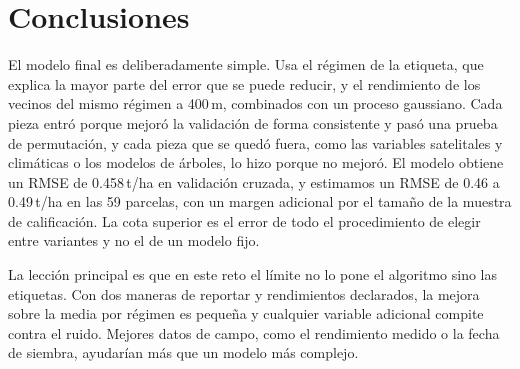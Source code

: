 \section{Conclusiones}\label{sec:conclusiones}

El modelo final es deliberadamente simple. Usa el régimen de la etiqueta, que explica la mayor parte del error que se
puede reducir, y el rendimiento de los vecinos del mismo régimen a 400\,m, combinados con un proceso gaussiano. Cada
pieza entró porque mejoró la validación de forma consistente y pasó una prueba de permutación, y cada pieza que se
quedó fuera, como las variables satelitales y climáticas o los modelos de árboles, lo hizo porque no mejoró. El
modelo obtiene un RMSE de 0.458\,t/ha en validación cruzada, y estimamos un RMSE de 0.46 a 0.49\,t/ha en las 59
parcelas, con un margen adicional por el tamaño de la muestra de calificación. La cota superior es el error de todo el
procedimiento de elegir entre variantes y no el de un modelo fijo.

La lección principal es que en este reto el límite no lo pone el algoritmo sino las etiquetas. Con dos maneras de
reportar y rendimientos declarados, la mejora sobre la media por régimen es pequeña y cualquier variable adicional
compite contra el ruido. Mejores datos de campo, como el rendimiento medido o la fecha de siembra, ayudarían más que
un modelo más complejo.
